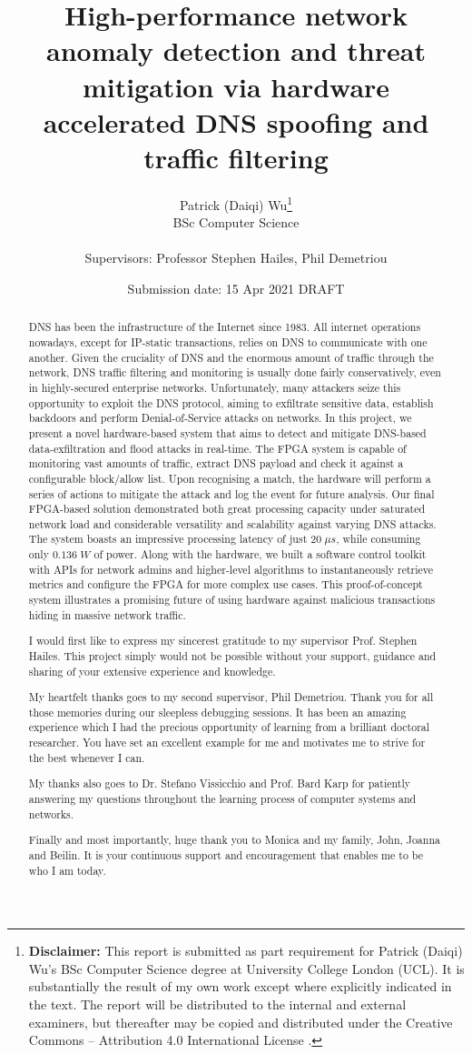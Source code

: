 \documentclass[a4paper]{report}
\title{{\vspace{-14em}}
{{\Huge High-performance network anomaly detection and threat mitigation via hardware accelerated DNS spoofing and traffic filtering}} \\
{\large}}
\date{Submission date: 15 Apr 2021 DRAFT}
\author{Patrick (Daiqi) Wu\thanks{
{\bf Disclaimer:}
This report is submitted as part requirement for Patrick (Daiqi) Wu's BSc Computer Science degree at University College London (UCL). It is
substantially the result of my own work except where explicitly indicated in the text.
The report will be distributed to the internal and external examiners, but thereafter may be copied and distributed under the Creative Commons -- Attribution 4.0 International License \cite{cc-by-4.0}.}
\\
BSc Computer Science\\ \\
Supervisors: Professor Stephen Hailes, Phil Demetriou}
\begin{document}
 
\onehalfspacing
\maketitle
\begin{abstract}
DNS has been the infrastructure of the Internet since 1983. All internet operations nowadays, except for IP-static transactions, relies on DNS to communicate with one another. Given the cruciality of DNS and the enormous amount of traffic through the network, DNS traffic filtering and monitoring is usually done fairly conservatively, even in highly-secured enterprise networks. Unfortunately, many attackers seize this opportunity to exploit the DNS protocol, aiming to exfiltrate sensitive data, establish backdoors and perform Denial-of-Service attacks on networks. In this project, we present a novel hardware-based system that aims to detect and mitigate DNS-based data-exfiltration and flood attacks in real-time. The FPGA system is capable of monitoring vast amounts of traffic, extract DNS payload and check it against a configurable block/allow list. Upon recognising a match, the hardware will perform a series of actions to mitigate the attack and log the event for future analysis. Our final FPGA-based solution demonstrated both great processing capacity under saturated network load and considerable versatility and scalability against varying DNS attacks. The system boasts an impressive processing latency of just $20\; \mu s$, while consuming only $0.136 \; W$ of power. Along with the hardware, we built a software control toolkit with APIs for network admins and higher-level algorithms to instantaneously retrieve metrics and configure the FPGA for more complex use cases. This proof-of-concept system illustrates a promising future of using hardware against malicious transactions hiding in massive network traffic.
\end{abstract}

\renewcommand{\abstractname}{Acknowledgements}
\begin{abstract}
I would first like to express my sincerest gratitude to my supervisor Prof. Stephen Hailes. This project simply would not be possible without your support, guidance and sharing of your extensive experience and knowledge.

My heartfelt thanks goes to my second supervisor, Phil Demetriou. Thank you for all those memories during our sleepless debugging sessions. It has been an amazing experience which I had the precious opportunity of learning from a brilliant doctoral researcher. You have set an excellent example for me and motivates me to strive for the best whenever I can.

My thanks also goes to Dr. Stefano Vissicchio and Prof. Bard Karp for patiently answering my questions throughout the learning process of computer systems and networks.

Finally and most importantly, huge thank you to Monica and my family, John, Joanna and Beilin. It is your continuous support and encouragement that enables me to be who I am today.
\end{abstract}
\end{document}
